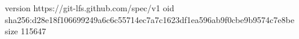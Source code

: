 version https://git-lfs.github.com/spec/v1
oid sha256:d28e18f106699249a6c6c55714ec7a7c1623df1ea596ab9f0cbe9b9574c7e8be
size 115647
